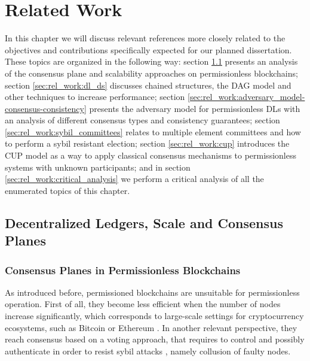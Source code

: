 
%

\chapter{Related Work}
\label{cha:related-work}

In this chapter we will discuss relevant references more closely related to the objectives and contributions specifically expected for our planned dissertation. These topics are organized in the following way: section \ref{sec:rel_work_dl_scale_consensus} presents an analysis of the consensus plane and scalability approaches on permissionless blockchains; section \ref{sec:rel_work:dl_ds} discusses chained structures, the DAG model and other techniques to increase performance; section \ref{sec:rel_work:adversary_model-consensus-consistency} presents the adversary model for permissionless \gls{DL}s with an analysis of different consensus types and consistency guarantees; section \ref{sec:rel_work:sybil_committees} relates to multiple element committees and how to perform a sybil resistant election; section \ref{sec:rel_work:cup} introduces the \gls{CUP} model as a way to apply classical consensus mechanisms to permissionless systems with unknown participants; and in section \ref{sec:rel_work:critical_analysis} we perform a critical analysis of all the enumerated topics of this chapter.

\section{Decentralized Ledgers, Scale and Consensus Planes}
\label{sec:rel_work_dl_scale_consensus}

\subsection{Consensus Planes in Permissionless Blockchains}


As introduced before, permissioned blockchains are unsuitable for permissionless operation. First of all, they become less efficient when the number of nodes increase significantly, which corresponds to large-scale settings for cryptocurrency ecosystems, such as Bitcoin \cite{bitcoin} or Ethereum \cite{ethereum}. In another relevant perspective, they reach consensus based on a voting approach, that requires to control and possibly authenticate in order to resist sybil attacks \cite{sybil_attack}, namely collusion of faulty nodes. 

